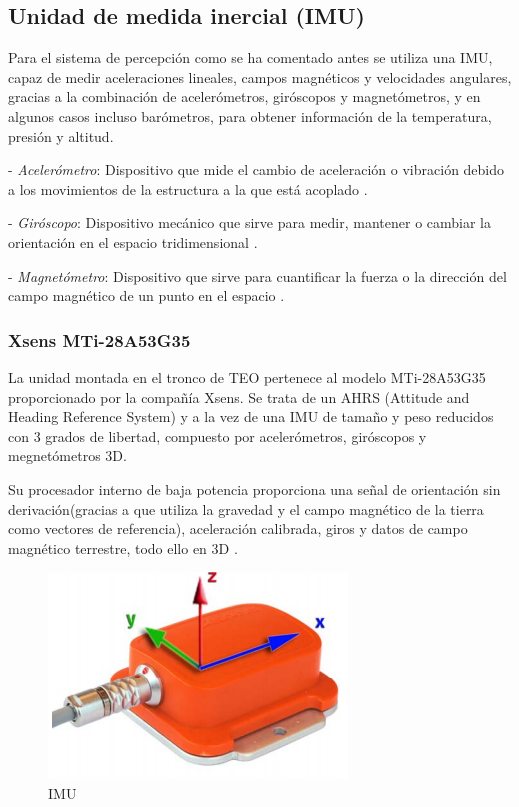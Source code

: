 \newpage

\subsection{Unidad de medida inercial (IMU)}

Para el sistema de percepción como se ha comentado antes se utiliza una IMU, capaz de medir aceleraciones lineales, campos magnéticos y velocidades angulares, gracias a la combinación de acelerómetros, giróscopos y magnetómetros, y en algunos casos incluso barómetros, para obtener información de la temperatura, presión y altitud.

- \emph{Acelerómetro}: Dispositivo que mide el cambio de aceleración o vibración debido a los movimientos de la estructura a la que está acoplado \cite{ref30}. %

- \emph{Giróscopo}: Dispositivo mecánico que sirve para medir, mantener o cambiar la orientación en el espacio tridimensional \cite{ref31}. 

- \emph{Magnetómetro}: Dispositivo que sirve para cuantificar la fuerza o la dirección del campo magnético de un punto en el espacio \cite{ref22}.

\subsubsection{Xsens MTi-28A53G35}

La unidad montada en el tronco de TEO pertenece al modelo MTi-28A53G35 proporcionado por la compañía Xsens. Se trata de un AHRS (Attitude and Heading Reference System) y a la vez de una IMU de tamaño y peso reducidos con 3 grados de libertad, compuesto por acelerómetros, giróscopos y megnetómetros 3D.

Su procesador interno de baja potencia proporciona una señal de orientación sin derivación(gracias a que utiliza la gravedad y el campo magnético de la tierra como vectores de referencia), aceleración calibrada, giros y datos de campo magnético terrestre, todo ello en 3D \cite{ref13}.

\begin{figure}[H]
\centering
\includegraphics[scale=0.8]{imagenes/apartado_3/38_2_inertial_sensor_xsens}
\caption{IMU}
\label{figura38}
\end{figure}

